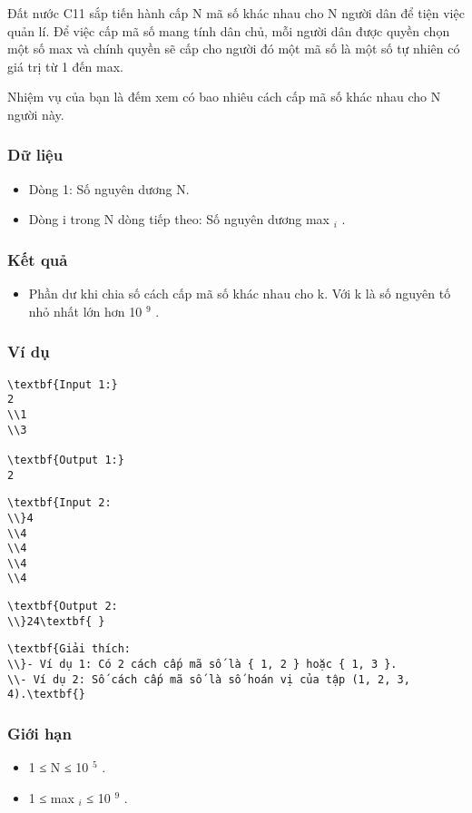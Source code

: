 



   Đất nước C11 sắp tiến hành cấp N mã số khác nhau cho N người dân để tiện việc quản lí. Để việc cấp mã số mang tính dân chủ, mỗi người dân được quyền chọn một số max và chính quyền sẽ cấp cho người đó một mã số là một số tự nhiên có giá trị từ 1 đến max.  

   Nhiệm vụ của bạn là đếm xem có bao nhiêu cách cấp mã số khác nhau cho N người này.  

\subsubsection{   Dữ liệu  }
\begin{itemize}
	\item     Dòng 1: Số nguyên dương N.   
	\item     Dòng i trong N dòng tiếp theo: Số nguyên dương max    $_     i    $    .   
\end{itemize}

\subsubsection{   Kết quả  }
\begin{itemize}
	\item     Phần dư khi chia số cách cấp mã số khác nhau cho k. Với k là số nguyên tố nhỏ nhất lớn hơn 10    $^     9    $    .   
\end{itemize}

\subsubsection{   Ví dụ  }
\begin{verbatim}
\textbf{Input 1:}
2
\\1
\\3

\textbf{Output 1:}
2\end{verbatim}
\begin{verbatim}
\textbf{Input 2:
\\}4
\\4
\\4
\\4
\\4 \end{verbatim}
\begin{verbatim}
\textbf{Output 2:
\\}24\textbf{ }\end{verbatim}
\begin{verbatim}
\textbf{Giải thích:
\\}- Ví dụ 1: Có 2 cách cấp mã số là { 1, 2 } hoặc { 1, 3 }.
\\- Ví dụ 2: Số cách cấp mã số là số hoán vị của tập (1, 2, 3, 4).\textbf{}\end{verbatim}

\subsubsection{   Giới hạn  }
\begin{itemize}
	\item     1 ≤ N ≤ 10    $^     5    $    .   
	\item     1 ≤ max    $_     i    $    ≤ 10    $^     9    $    .   
\end{itemize}